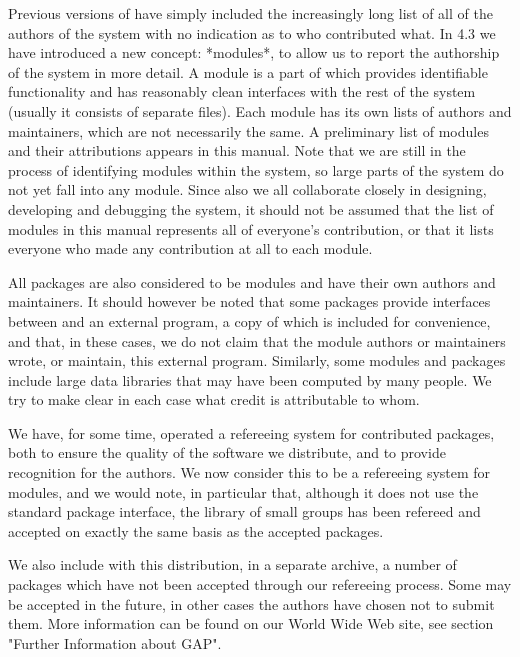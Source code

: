 
Previous versions of {\GAP} have simply included the increasingly long
list of all of the authors of the system with no indication as to who
contributed what. In {\GAP} 4.3 we have introduced a new concept:
*modules*, to allow us to report the authorship of the system in more
detail. A module is a part of {\GAP} which provides identifiable
functionality and has reasonably clean interfaces with the rest of the
system (usually it consists of separate files). Each module has its
own lists of authors and maintainers, which are not necessarily the
same. A preliminary list of modules and their attributions appears in
this manual. Note that we are still in the process of identifying
modules within the system, so large parts of the system do not yet
fall into any module. Since also we all collaborate closely in
designing, developing and debugging the system, it should not be
assumed that the list of modules in this manual represents all of
everyone's contribution, or that it lists everyone who made any
contribution at all to each module.

All {\GAP} packages are also considered to be modules and have their
own authors and maintainers. It should however be noted that some
packages provide interfaces between {\GAP} and an external program, a
copy of which is included for convenience, and that, in these cases,
we do not claim that the module authors or maintainers wrote, or
maintain, this external program. Similarly, some modules and packages
include large data libraries that may have been computed by many
people. We try to make clear in each case what credit is attributable
to whom.

We have, for some time, operated a refereeing system for contributed
packages, both to ensure the quality of the software we distribute,
and to provide recognition for the authors. We now consider this to be
a refereeing system for modules, and we would note, in particular
that, although it does not use the standard package interface, the
library of small groups has been refereed and accepted on exactly the
same basis as the accepted  packages.

We also include with this distribution, in a separate archive, a
number of packages which have not been accepted through our refereeing
process. Some may be accepted in the future, in other cases the
authors have chosen not to submit them.  More information can be found
on our World Wide Web site, see section "Further Information about
GAP".


